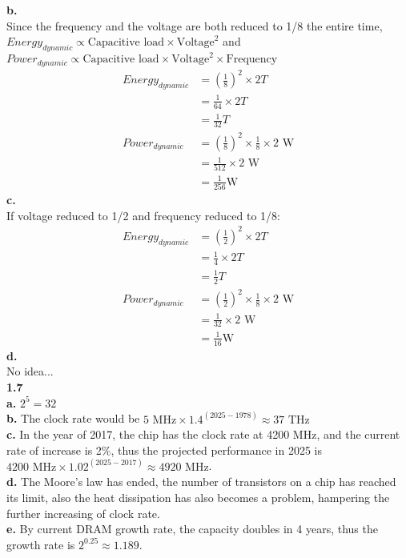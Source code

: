 \documentclass{article}
\begin{document}
\indent \textbf{b.}\\
\indent Since the frequency and the voltage are both reduced to 1/8 the entire time, $Energy_{dynamic}\propto\text{Capacitive load}\times\text{Voltage}^2$ and $Power_{dynamic}\propto\text{Capacitive load}\times\text{Voltage}^2\times\text{Frequency}$\\
\begin{align*}
    Energy_{dynamic}&=\left(\frac{1}{8}\right)^2\times 2T\\
    &=\frac{1}{64}\times 2T\\
    &=\frac{1}{32}T\\
    Power_{dynamic}&=\left(\frac{1}{8}\right)^2\times\frac{1}{8}\times \text{2 W}\\
    &=\frac{1}{512}\times\text{2 W}\\
    &=\frac{1}{256}\text{W}
\end{align*}
\indent \textbf{c.}\\
\indent If voltage reduced to 1/2 and frequency reduced to 1/8:
\begin{align*}
    Energy_{dynamic}&=\left(\frac{1}{2}\right)^2\times 2T\\
    &=\frac{1}{4}\times 2T\\
    &=\frac{1}{2}T\\
    Power_{dynamic}&=\left(\frac{1}{2}\right)^2\times\frac{1}{8}\times \text{2 W}\\
    &=\frac{1}{32}\times\text{2 W}\\
    &=\frac{1}{16}\text{W}
\end{align*}
\indent \textbf{d.}\\
No idea...\\

\noindent\textbf{1.7}\\
\indent \textbf{a.} $2^5=32$\\
\indent \textbf{b.} The clock rate would be $\text{5 MHz}\times 1.4^(2025-1978)\approx\text{37 THz}$\\
\indent \textbf{c.} In the year of 2017, the chip has the clock rate at 4200 MHz, and the current rate of increase is 2\%, thus the projected performance in 2025 is $\text{4200 MHz}\times 1.02^(2025-2017)\approx\text{4920 MHz}$.\\
\indent \textbf{d.} The Moore's law has ended, the number of transistors on a chip has reached its limit, also the heat dissipation has also becomes a problem, hampering the further increasing of clock rate.\\
\indent \textbf{e. } By current DRAM growth rate, the capacity doubles in 4 years, thus the growth rate is $2^{0.25}\approx 1.189$.\\
\end{document}
